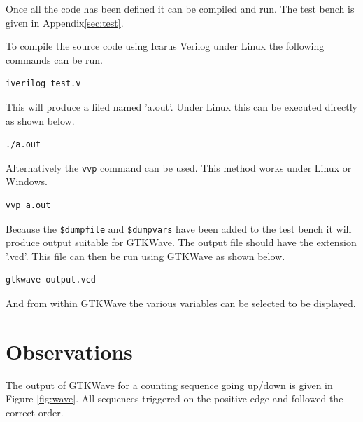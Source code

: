 \documentclass[12pt]{article}
\begin{document}
Once all the code has been defined it can be compiled and run.
The test bench is given in Appendix\ref{sec:test}.

To compile the source code using Icarus Verilog\cite{VERILOG}
under Linux the following commands can be run.

\begin{verbatim}
iverilog test.v
\end{verbatim}

This will produce a filed named 'a.out'.
Under Linux this can be executed directly as shown below.

\begin{verbatim}
./a.out
\end{verbatim}

Alternatively the \verb+vvp+ command can be used.
This method works under Linux or Windows.

\begin{verbatim}
vvp a.out
\end{verbatim}

Because the \verb+$dumpfile+ and \verb+$dumpvars+ have been
added to the test bench it will produce output suitable
for GTKWave\cite{GTKWAVE}.
The output file should have the extension '.vcd'.
This file can then be run using GTKWave as shown below.

\begin{verbatim}
gtkwave output.vcd
\end{verbatim}

And from within GTKWave the various variables can be selected
to be displayed.



\section{Observations}

The output of GTKWave for a counting sequence going up/down is
given in Figure \ref{fig:wave}.
All sequences triggered on the positive edge and followed the
correct order.
\end{document}
